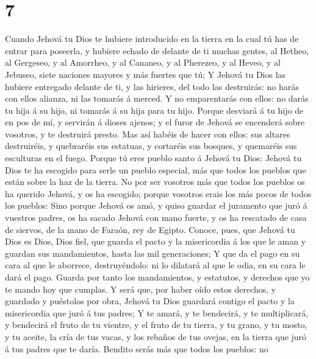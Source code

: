 \hypertarget{section-6}{%
\section{7}\label{section-6}}

 Cuando Jehová tu Dios te hubiere introducido en la tierra
en la cual tú has de entrar para poseerla, y hubiere echado de delante
de ti muchas gentes, al Hetheo, al Gergeseo, y al Amorrheo, y al
Cananeo, y al Pherezeo, y al Heveo, y al Jebuseo, siete naciones mayores
y más fuertes que tú;  Y Jehová tu Dios las hubiere
entregado delante de ti, y las hirieres, del todo las destruirás: no
harás con ellos alianza, ni las tomarás á merced.  Y no
emparentarás con ellos: no darás tu hija á su hijo, ni tomarás á su hija
para tu hijo.  Porque desviará á tu hijo de en pos de mí, y
servirán á dioses ajenos; y el furor de Jehová se encenderá sobre
vosotros, y te destruirá presto.  Mas así habéis de hacer
con ellos: sus altares destruiréis, y quebraréis sus estatuas, y
cortaréis sus bosques, y quemaréis sus esculturas en el fuego.
 Porque tú eres pueblo santo á Jehová tu Dios: Jehová tu
Dios te ha escogido para serle un pueblo especial, más que todos los
pueblos que están sobre la haz de la tierra.  No por ser
vosotros más que todos los pueblos os ha querido Jehová, y os ha
escogido; porque vosotros erais los más pocos de todos los pueblos:
 Sino porque Jehová os amó, y quiso guardar el juramento que
juró á vuestros padres, os ha sacado Jehová con mano fuerte, y os ha
rescatado de casa de siervos, de la mano de Faraón, rey de Egipto.
 Conoce, pues, que Jehová tu Dios es Dios, Dios fiel, que
guarda el pacto y la misericordia á los que le aman y guardan sus
mandamientos, hasta las mil generaciones;  Y que da el pago
en su cara al que le aborrece, destruyéndolo: ni lo dilatará al que le
odia, en su cara le dará el pago.  Guarda por tanto los
mandamientos, y estatutos, y derechos que yo te mando hoy que cumplas.
 Y será que, por haber oído estos derechos, y guardado y
puéstolos por obra, Jehová tu Dios guardará contigo el pacto y la
misericordia que juró á tus padres;  Y te amará, y te
bendecirá, y te multiplicará, y bendecirá el fruto de tu vientre, y el
fruto de tu tierra, y tu grano, y tu mosto, y tu aceite, la cría de tus
vacas, y los rebaños de tus ovejas, en la tierra que juró á tus padres
que te daría.  Bendito serás más que todos los pueblos: no
